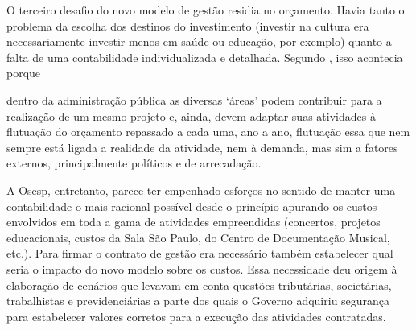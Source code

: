 \documentclass[a4paper, 12pt, openright, oneside, german, french, english, brazil]{abntex2}
\begin{document}
	O terceiro desafio do novo modelo de gestão residia no orçamento. Havia tanto o problema da escolha dos destinos do investimento (investir na cultura era necessariamente investir menos em saúde ou educação, por exemplo) quanto a falta de uma contabilidade individualizada e detalhada. Segundo , isso acontecia porque 
	
	\begin{citacao}
		dentro da administração pública as diversas `áreas' podem contribuir para a realização de um mesmo projeto e, ainda, devem adaptar suas atividades à flutuação do orçamento repassado a cada uma, ano a ano, flutuação essa que nem sempre está ligada a realidade da atividade, nem à demanda, mas sim a fatores externos, principalmente políticos e de arrecadação. \cite[p. 10]{arruda2010parcerias} 
	\end{citacao}
	
	A Osesp, entretanto, parece ter empenhado esforços no sentido de manter uma contabilidade o mais racional possível desde o princípio apurando os custos envolvidos em toda a gama de atividades empreendidas (concertos, projetos educacionais, custos da Sala São Paulo, do Centro de Documentação Musical, etc.). Para firmar o contrato de gestão era necessário também estabelecer qual seria o impacto do novo modelo sobre os custos. Essa necessidade deu origem à elaboração de cenários que levavam em conta questões tributárias, societárias, trabalhistas e previdenciárias a parte dos quais o Governo adquiriu segurança para estabelecer valores corretos para a execução das atividades contratadas.
	
\end{document}
